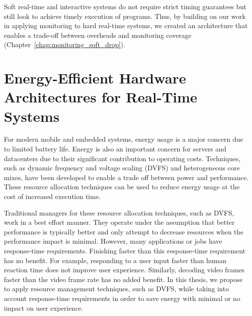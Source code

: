 Soft real-time and interactive systems do not require strict timing guarantees
but still look to achieve timely execution of programs. Thus, by building on
our work in applying monitoring to hard real-time systems, we created an
architecture that enables a trade-off between overheads and monitoring coverage
(Chapter~\ref{chap:monitoring_soft_drop}). 

\section{Energy-Efficient Hardware Architectures for Real-Time Systems}
\label{sec:intro.energy}

For modern mobile and embedded systems, energy usage is a major concern due to
limited battery life. Energy is also an important concern for servers and
datacenters due to their significant contribution to operating costs.
Techniques, such as dynamic frequency and voltage scaling (DVFS) and
heterogeneous core mixes, have been developed to enable a trade off between
power and performance. These resource allocation techniques can be used to
reduce energy usage at the cost of increased execution time.

Traditional managers for these resource allocation techniques, such as DVFS,
work in a best effort manner. They operate under the assumption that better
performance is typically better and only attempt to decrease resources when the
performance impact is minimal.  However, many applications or jobs have
response-time requirements.  Finishing faster than this response-time
requirement has no benefit. For example, responding to a user input faster than
human reaction time does not improve user experience. Similarly, decoding video
frames faster than the video frame rate has no added benefit. In this thesis,
we propose to apply resource management techniques, such as DVFS, while taking
into account response-time requirements in order to save energy with minimal or
no impact on user experience.


